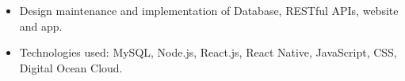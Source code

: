 \documentclass[10pt,a4paper,ragged2e,withhyper]{altacv}
\begin{document}
    \begin{paracol}{2}
        
        
        
            \begin{itemize}
                \item Design maintenance and implementation of Database, RESTful APIs, website and app.
                \item Technologies used: MySQL, Node.js, React.js, React Native, JavaScript, CSS, Digital Ocean Cloud. 
            \end{itemize}
            \divider
            

\end{paracol}
\end{document}
